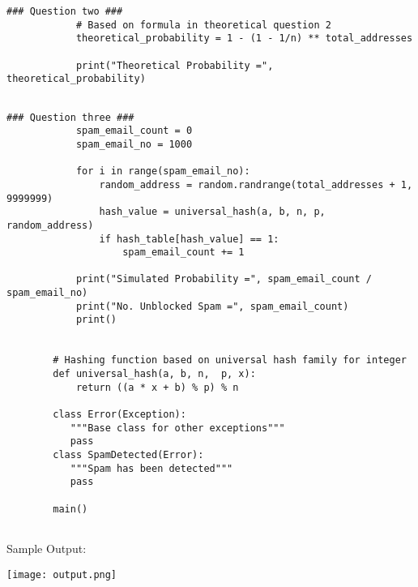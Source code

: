 \documentclass[12pt,letterpaper]{article}
\begin{document}
\begin{enumerate}
\begin{lstlisting}[style = Python]
        ### Question two ###
            # Based on formula in theoretical question 2
            theoretical_probability = 1 - (1 - 1/n) ** total_addresses

            print("Theoretical Probability =", theoretical_probability)
            
        \end{lstlisting}
        \pagebreak
        \begin{lstlisting}[style = Python]	
        ### Question three ###
            spam_email_count = 0
            spam_email_no = 1000
            
            for i in range(spam_email_no):
                random_address = random.randrange(total_addresses + 1, 9999999)
                hash_value = universal_hash(a, b, n, p, random_address)
                if hash_table[hash_value] == 1:
                    spam_email_count += 1

            print("Simulated Probability =", spam_email_count / spam_email_no)
            print("No. Unblocked Spam =", spam_email_count)
            print()


        # Hashing function based on universal hash family for integer
        def universal_hash(a, b, n,  p, x):
            return ((a * x + b) % p) % n

        class Error(Exception):
           """Base class for other exceptions"""
           pass
        class SpamDetected(Error):
           """Spam has been detected"""
           pass

        main()
		
		\end{lstlisting}
		
		Sample Output:
		
		\texttt{[image: output.png]}
		
		
	\end{enumerate}
	
\end{document}
